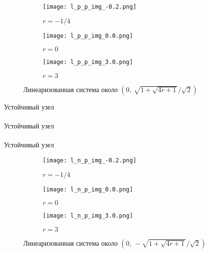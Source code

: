 \documentclass[12pt]{article}
\begin{document}
\begin{figure}[H]
     \centering
     \begin{subfigure}[b]{0.3\textwidth}
         \centering
         \texttt{[image: l\_p\_p\_img\_-0.2.png]}
         \caption{$r=-1/4$}
         \label{fig:l_p_p_img_-0.2.png}
     \end{subfigure}
     \hfill
     \begin{subfigure}[b]{0.3\textwidth}
         \centering
         \texttt{[image: l\_p\_p\_img\_0.0.png]}
         \caption{$r=0$}
         \label{fig:l_p_p_img_0.0.png}
     \end{subfigure}
     \hfill
     \begin{subfigure}[b]{0.3\textwidth}
         \centering
         \texttt{[image: l\_p\_p\_img\_3.0.png]}
         \caption{$r=3$}
         \label{fig:l_p_p_img_3.0.png}
     \end{subfigure}
        \caption{Линеаризованная система около $(0,\ \sqrt{1+\sqrt{4r+1}}/\sqrt{2})$}
        \label{fig:three graphs}
\end{figure}

\begin{center}
    Устойчивый узел \\
    \downarrow \\
    Устойчивый узел \\
    \downarrow \\
    Устойчивый узел \\
\end{center}

\begin{figure}[H]
     \centering
     \begin{subfigure}[b]{0.3\textwidth}
         \centering
         \texttt{[image: l\_n\_p\_img\_-0.2.png]}
         \caption{$r=-1/4$}
         \label{fig:l_n_p_img_-0.2.png}
     \end{subfigure}
     \hfill
     \begin{subfigure}[b]{0.3\textwidth}
         \centering
         \texttt{[image: l\_n\_p\_img\_0.0.png]}
         \caption{$r=0$}
         \label{fig:l_n_p_img_0.0.png}
     \end{subfigure}
     \hfill
     \begin{subfigure}[b]{0.3\textwidth}
         \centering
         \texttt{[image: l\_n\_p\_img\_3.0.png]}
         \caption{$r=3$}
         \label{fig:l_n_p_img_3.0.png}
     \end{subfigure}
        \caption{Линеаризованная система около $(0,\ -\sqrt{1+\sqrt{4r+1}}/\sqrt{2})$}
        \label{fig:three graphs}
\end{figure}
\end{document}
